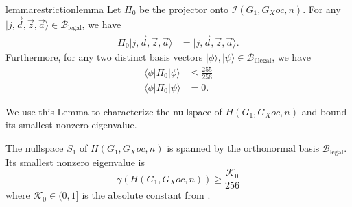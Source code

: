 \documentclass[../thesis-main/thesis-main]{subfiles}
\begin{document}
\begin{restatable}{lemma}{restrictionlemma}
\label{lem:Pi_0_restriction}
Let $\Pi_{0}$ be the projector onto $\mathcal{I}(G_{1},G_Xoc,n)$. For any $|j,\vec{d},\vec{z},\vec{a}\rangle\in\mathcal{B}_{\text{legal}}$, we have
\begin{align}
\Pi_{0}|j,\vec{d},\vec{z},\vec{a}\rangle & =|j,\vec{d},\vec{z},\vec{a}\rangle\label{eq:subspace_eqn0}.
\end{align}
Furthermore, for any two distinct basis vectors $|\phi\rangle,|\psi\rangle\in\mathcal{B}_{\text{illegal}}$, we have 
\begin{align}
\langle\phi|\Pi_{0}|\phi\rangle & \leq\frac{255}{256}\label{eq:subspace_eqn1}\\
\langle\phi|\Pi_{0}|\psi\rangle & =0.\label{eq:subspace_eqn2}
\end{align}
\end{restatable}

We use this Lemma to characterize the nullspace of $H(G_{1},G_Xoc,n)$ and bound its smallest nonzero eigenvalue.

\begin{lemma}
\label{lem:H_Galpha_Gtilde}The nullspace $S_1$ of $H(G_{1},G_Xoc,n)$ is spanned by the orthonormal basis $\mathcal{B}_{\text{legal}}$. Its smallest nonzero eigenvalue is
\begin{equation}
  \gamma(H(G_{1},G_Xoc,n)) \geq \frac{\mathcal{K}_0}{256} \label{eq:G_alpha_lowerbnd}
\end{equation}
where $\mathcal{K}_0\in (0,1]$ is the absolute constant from .
\end{lemma}
\end{document}
